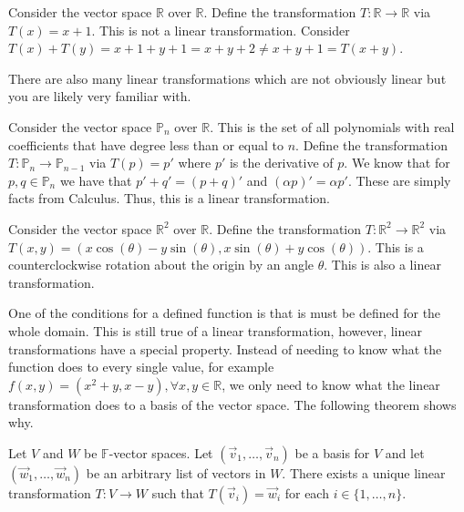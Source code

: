 \begin{example}
    Consider the vector space $\mathbb{R}$ over $\mathbb{R}$. Define the transformation $T:\mathbb{R}\to\mathbb{R}$ via $T(x)=x+1$. This is not a linear transformation. Consider $T(x)+T(y)=x+1+y+1=x+y+2\neq x+y+1=T(x+y)$.
\end{example}
There are also many linear transformations which are not obviously linear but you are likely very familiar with.
\begin{example}
    Consider the vector space $\mathbb{P}_n$ over $\mathbb{R}$. This is the set of all polynomials with real coefficients that have degree less than or equal to $n$. Define the transformation $T:\mathbb{P}_n\to\mathbb{P}_{n-1}$ via $T(p)=p'$ where $p'$ is the derivative of $p$. We know that for $p, q\in\mathbb{P}_n$ we have that $p'+q'=(p+q)'$ and $(\alpha p)'=\alpha p'$. These are simply facts from Calculus. Thus, this is a linear transformation.
\end{example}
\begin{example}
    Consider the vector space $\mathbb{R}^2$ over $\mathbb{R}$. Define the transformation $T:\mathbb{R}^2\to\mathbb{R}^2$ via $T(x,y)=(x\cos(\theta)-y\sin(\theta),x\sin(\theta)+y\cos(\theta))$. This is a counterclockwise rotation about the origin by an angle $\theta$. This is also a linear transformation.
\end{example}
One of the conditions for a defined function is that is must be defined for the whole domain. This is still true of a linear transformation, however, linear transformations have a special property. Instead of needing to know what the function does to every single value, for example $f(x,y)=(x^2+y, x-y), \forall x,y\in\mathbb{R}$, we only need to know what the linear transformation does to a basis of the vector space. The following theorem shows why.
\begin{theorem}
    Let $V$ and $W$ be $\mathbb{F}$-vector spaces. Let $(\vec{v}_1,\ldots,\vec{v}_n)$ be a basis for $V$ and let $(\vec{w}_1,\ldots,\vec{w}_n)$ be an arbitrary list of vectors in $W$. There exists a unique linear transformation $T:V\to W$ such that $T(\vec{v}_i)=\vec{w}_i$ for each $i\in\{1,\ldots, n\}$.
\end{theorem}
